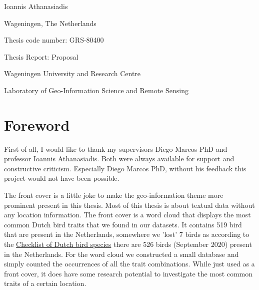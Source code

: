\documentclass[a4paper, 12pt, oneside]{book} %
\begin{document}
\begin{titlingpage}
\begin{center}
  {Ioannis Athanasiadis}\vspace{3.0cm}
  
  
  
  \end{center}
  
  \begin{center}
    {\thedate}
  
    {Wageningen, The Netherlands}
  \end{center}\vspace{5cm}

    Thesis code number: GRS-80400
  
    Thesis Report: Proposal
  
    {Wageningen University and Research Centre}
  
    {Laboratory of Geo-Information Science and Remote Sensing}
 \end{titlingpage}
\graphicspath{ {./figures/} }

\newpage
\thispagestyle{empty}
\section*{Foreword}
First of all, I would like to thank my supervisors Diego Marcos PhD and professor Ioannis Athanasiadis.
Both were always available for support and constructive criticism.
Especially Diego Marcos PhD, without his feedback this project would not have been possible.
\newline

\noindent
The front cover is a little joke to make the geo-information theme more prominent present in this thesis. 
Most of this thesis is about textual data without any location information.
The front cover is a word cloud that displays the most common Dutch bird traits that we found in our datasets. 
It contains 519 bird that are present in the Netherlands, somewhere we 'lost' 7 birds as according to the \href{https://avibase.bsc-eoc.org/checklist.jsp?region=NL&list=howardmoore}{Checklist of Dutch bird species} there are   526 birds (September 2020) present in the Netherlands.
For the word cloud we constructed a small database and simply counted the occurrences of all the trait combinations.
While just used as a front cover, it does have some research potential to investigate the most common traits of a certain location.
\end{document}
